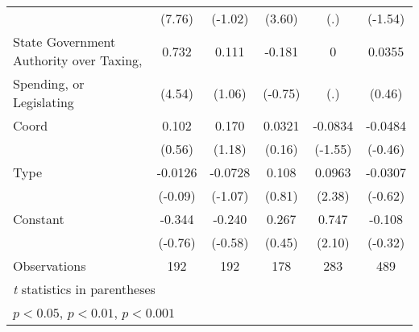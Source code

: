 {\begin{tabular}{l*{5}{c}}
                                        &    (7.76)         &   (-1.02)         &    (3.60)         &       (.)         &   (-1.54)         \\
\addlinespace
State Government Authority over Taxing, &     0.732\sym{***}&     0.111         &    -0.181         &         0         &    0.0355         \\
Spending, or Legislating                &    (4.54)         &    (1.06)         &   (-0.75)         &       (.)         &    (0.46)         \\
\addlinespace
Coord                                   &     0.102         &     0.170         &    0.0321         &   -0.0834         &   -0.0484         \\
                                        &    (0.56)         &    (1.18)         &    (0.16)         &   (-1.55)         &   (-0.46)         \\
\addlinespace
Type                                    &   -0.0126         &   -0.0728         &     0.108         &    0.0963\sym{*}  &   -0.0307         \\
                                        &   (-0.09)         &   (-1.07)         &    (0.81)         &    (2.38)         &   (-0.62)         \\
\addlinespace
Constant                                &    -0.344         &    -0.240         &     0.267         &     0.747\sym{*}  &    -0.108         \\
                                        &   (-0.76)         &   (-0.58)         &    (0.45)         &    (2.10)         &   (-0.32)         \\
\midrule
Observations                            &       192         &       192         &       178         &       283         &       489         \\
\bottomrule
\multicolumn{6}{l}{\footnotesize \textit{t} statistics in parentheses}\\
\multicolumn{6}{l}{\footnotesize \sym{*} \(p<0.05\), \sym{**} \(p<0.01\), \sym{***} \(p<0.001\)}\\
\end{tabular}
}

